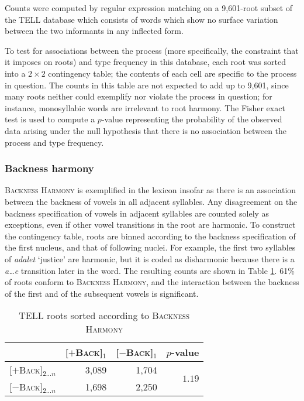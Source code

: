 Counts were computed by regular expression matching on a 9,601-root subset of the TELL database which consists of words which show no surface variation between the two informants in any inflected form.

To test for associations between the process (more specifically, the constraint that it imposes on roots) and type frequency in this database, each root was sorted into a $2 \times 2$ contingency table; the contents of each cell are specific to the process in question. The counts in this table are not expected to add up to 9,601, since many roots neither could exemplify nor violate the process in question; for instance, monosyllabic words are irrelevant to root harmony. The Fisher exact test is used to compute a $p$-value representing the probability of the observed data arising under the null hypothesis that there is no association between the process and type frequency.

\subsubsection{Backness harmony}

\textsc{Backness Harmony} is exemplified in the lexicon insofar as there is an association between the backness of vowels in all adjacent syllables. Any disagreement on the backness specification of vowels in adjacent syllables are counted solely as exceptions, even if other vowel transitions in the root are harmonic. 
To construct the contingency table, roots are binned according to the backness specification of the first nucleus, and that of following nuclei. For example, the first two syllables of \emph{adalet} `justice' are harmonic, but it is coded as disharmonic because there is a \emph{a\ldots{}e} transition later in the word. The resulting counts are shown in Table \ref{bhs}. 61\% of roots conform to \textsc{Backness Harmony}, and the interaction between the backness of the first and of the subsequent vowels
is significant.

\begin{table}
\centering
\begin{tabular}{lrrr}
\toprule
                             & [$+$\textsc{Back}]$_1$ & [$-$\textsc{Back}]$_1$ & $p$-value                     \\
\midrule
\buf{}[$+$\textsc{Back}]$_{2\ldots{}n}$ & 3,089                     & 1,704              & \multirow{2}{*}{$1.19$\e{-89}} \\
\buf{}[$-$\textsc{Back}]$_{2\ldots{}n}$ & 1,698                     & 2,250                                               \\
\bottomrule
\end{tabular}
\caption{TELL roots sorted according to \textsc{Backness Harmony}}
\label{bhs}
\end{table}

